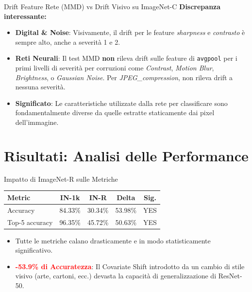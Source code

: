 \documentclass[aspectratio=169]{beamer}
\begin{document}
\begin{frame}{Drift Feature Rete (MMD) vs Drift Visivo su ImageNet-C}
    \textbf{Discrepanza interessante:}
    \vspace{0.2cm}
    \begin{itemize}
        \item \textbf{Digital \& Noise}: Visivamente, il drift per le feature \textit{sharpness} e \textit{contrasto} è sempre alto, anche a severità 1 e 2.
        \item \textbf{Reti Neurali}: Il test MMD \textbf{non} rileva drift sulle feature di \texttt{avgpool} per i primi livelli di severità per corruzioni come \textit{Contrast}, \textit{Motion Blur}, \textit{Brightness}, o \textit{Gaussian Noise}. Per \textit{JPEG\_compression}, non rileva drift a nessuna severità.
        \item \textbf{Significato}: Le caratteristiche utilizzate dalla rete per classificare sono fondamentalmente diverse da quelle estratte staticamente dai pixel dell'immagine.
    \end{itemize}
\end{frame}

\section{Risultati: Analisi delle Performance}

\begin{frame}{Impatto di ImageNet-R sulle Metriche}
    \begin{table}[]
        \centering
        \begin{tabular}{lcccc}
        \hline
        \textbf{Metric} & \textbf{IN-1k} & \textbf{IN-R} & \textbf{Delta} & \textbf{Sig.} \\
        \hline
        Accuracy            & 84.33\% & 30.34\% & 53.98\% & YES \\
        Top-5 accuracy      & 96.35\% & 45.72\% & 50.63\% & YES \\
        \hline
        \end{tabular}
    \end{table}
    \vspace{0.3cm}
    \begin{itemize}
        \item Tutte le metriche calano drasticamente e in modo statisticamente significativo.
        \item \textcolor{red}{\textbf{-53.9\% di Accuratezza}}: Il Covariate Shift introdotto da un cambio di stile visivo (arte, cartoni, ecc.) devasta la capacità di generalizzazione di ResNet-50.
    \end{itemize}
\end{frame}
\end{document}
